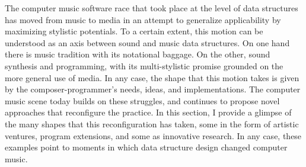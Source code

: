 The computer music software race that took place at the level of data structures has moved from music to media in an attempt to generalize applicability by maximizing stylistic potentials. To a certain extent, this motion can be understood as an axis between sound and music data structures. On one hand there is music tradition with its notational baggage. On the other, sound synthesis and programming, with its multi-stylistic promise grounded on the more general use of media. In any case, the shape that this motion takes is given by the composer-programmer's needs, ideas, and implementations. The computer music scene today builds on these struggles, and continues to propose novel approaches that reconfigure the practice. In this section, I provide a glimpse of the many shapes that this reconfiguration has taken, some in the form of artistic ventures, program extensions, and some as innovative research. In any case, these examples point to moments in which data structure design changed computer music.


